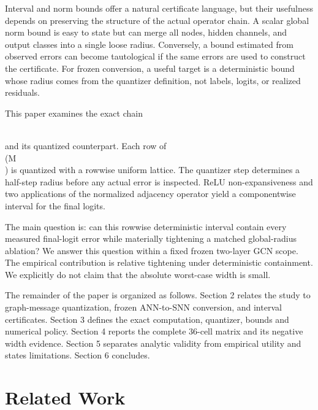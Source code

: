 \documentclass{article}
\begin{document}
Interval and norm bounds offer a natural certificate language, but their usefulness depends on preserving the structure of the actual operator chain. A scalar global norm bound is easy to state but can merge all nodes, hidden channels, and output classes into a single loose radius. Conversely, a bound estimated from observed errors can become tautological if the same errors are used to construct the certificate. For frozen conversion, a useful target is a deterministic bound whose radius comes from the quantizer definition, not labels, logits, or realized residuals.

This paper examines the exact chain

\\[
M=XW\_0,\\qquad \\widehat M=Q\_\{\\mathrm{row}\}(M),\\qquad
H=\\operatorname{relu}(AM+b\_0),\\qquad
Z=AHW\_1+b\_\{\\mathrm{out}\},
\\]

and its quantized counterpart. Each row of \\(M\\) is quantized with a rowwise uniform lattice. The quantizer step determines a half-step radius before any actual error is inspected. ReLU non-expansiveness and two applications of the normalized adjacency operator yield a componentwise interval for the final logits.

The main question is: can this rowwise deterministic interval contain every measured final-logit error while materially tightening a matched global-radius ablation? We answer this question within a fixed frozen two-layer GCN scope. The empirical contribution is relative tightening under deterministic containment. We explicitly do not claim that the absolute worst-case width is small.

The remainder of the paper is organized as follows. Section 2 relates the study to graph-message quantization, frozen ANN-to-SNN conversion, and interval certificates. Section 3 defines the exact computation, quantizer, bounds and numerical policy. Section 4 reports the complete 36-cell matrix and its negative width evidence. Section 5 separates analytic validity from empirical utility and states limitations. Section 6 concludes.

\section{Related Work}
\end{document}
